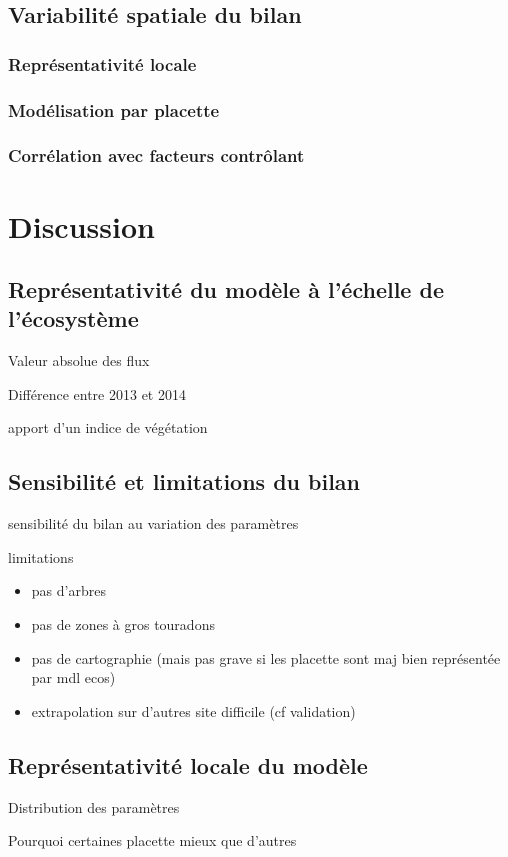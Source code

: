 \subsection{Variabilité spatiale du bilan}

\subsubsection{Représentativité locale}

\subsubsection{Modélisation par placette}

\subsubsection{Corrélation avec facteurs contrôlant}

\section{Discussion}

\subsection{Représentativité du modèle à l'échelle de l'écosystème}

Valeur absolue des flux

Différence entre 2013 et 2014

apport d'un indice de végétation

\subsection{Sensibilité et limitations du bilan}

sensibilité du bilan au variation des paramètres

limitations

\begin{itemize}
\item pas d'arbres
\item pas de zones à gros touradons
\item pas de cartographie (mais pas grave si les placette sont maj bien représentée par mdl ecos)
\item extrapolation sur d'autres site difficile (cf validation)
\end{itemize}

\subsection{Représentativité locale du modèle}

Distribution des paramètres

Pourquoi certaines placette mieux que d'autres




